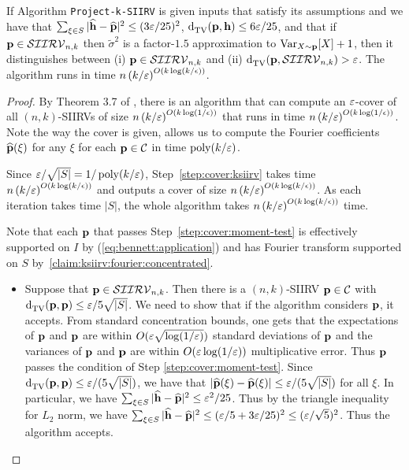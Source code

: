 \begin{lemma} If Algorithm \texttt{Project-k-SIIRV} is given inputs that satisfy its assumptions and we have that $\sum_{\xi \in S} |\fourier{\h}-\fourier{\p}|^2 \leq (3\eps/25)^2$, $\totalvardist{\p}{\h} \leq 6\eps/25$, and that if $\p\in\classksiirv[n]{k}$ then $\widetilde{\sigma}^2$ is a factor-$1.5$ approximation to $\var_{X \sim \p}[X]+1$, then it distinguishes between (i) $\p\in\classksiirv[n]{k}$ and (ii) $ \totalvardist{\p}{\classksiirv[n]{k}}>\eps$. The algorithm runs in time $n\left( k/\eps \right)^{O(k\log(k/\epsilon))}$.\end{lemma}
\begin{proof}
By Theorem 3.7 of \cite{DKS:15}, there is an algorithm that can compute an $\eps$-cover of all $(n,k)$-SIIRVs of size $n\left( k/\eps \right)^{O(k\log(1/\epsilon))}$ that runs in time $n\left( k/\eps \right)^{O(k\log(1/\epsilon))}$. Note the way the cover is given, allows us to compute the Fourier coefficients $\fourier{\q}(\xi)$ for any $\xi$ for each $\q \in \mathcal{C}$ in time $\poly(k/\eps)$.

 Since $\eps/\sqrt{|S|}=1/\poly(k/\eps)$, Step~\ref{step:cover:ksiirv} takes time $n\left( k/\eps \right)^{O(k\log(k/\epsilon))}$ and outputs a cover of size $n\left( k/\eps \right)^{O(k\log(k/\epsilon))}$. As each iteration takes time $|S|$, the whole algorithm takes $n\left( k/\eps \right)^{O(k\log(k/\epsilon))}$ time.

Note that each $\q$ that passes Step~\ref{step:cover:moment-test} is effectively supported on $I$ by (\ref{eq:bennett:application}) and has Fourier transform supported on $S$ by~\cref{claim:ksiirv:fourier:concentrated}.

\begin{itemize}
  \item Suppose that $\p\in\classksiirv[n]{k}$. Then there is a $(n,k)$-SIIRV $\q \in \mathcal{C}$ with $ \totalvardist{\p}{\q} \leq {\eps}/{5\sqrt{|S|}}$.
We need to show that if the algorithm considers $\q$, it accepts. From standard concentration bounds, one gets that the expectations of $\p$ and $\q$ are within $O(\eps\sqrt{\log(1/\eps)})$ standard deviations of $\p$ and the variances of $\p$ and $\q$ are within $O(\eps\log(1/\eps))$ multiplicative error.
Thus $\q$ passes the condition of Step \ref{step:cover:moment-test}. Since $ \totalvardist{\p}{\q} \leq \eps/(5\sqrt{|S|})$, we have that $|\fourier{\p}(\xi)-\fourier{\q}(\xi)| \leq \eps/(5\sqrt{|S|})$ for all $\xi$.
In particular, we have $\sum_{\xi \in S} |\fourier{\h}-\fourier{\q}|^2 \leq \eps^2/25$. Thus by the triangle inequality for $L_2$ norm, we have  $\sum_{\xi \in S} |\fourier{\h}-\fourier{\q}|^2 \leq (\eps/5 + 3\eps/25)^2 \leq (\eps/\sqrt{5})^2$. Thus the algorithm accepts.


\end{itemize}
\end{proof}
